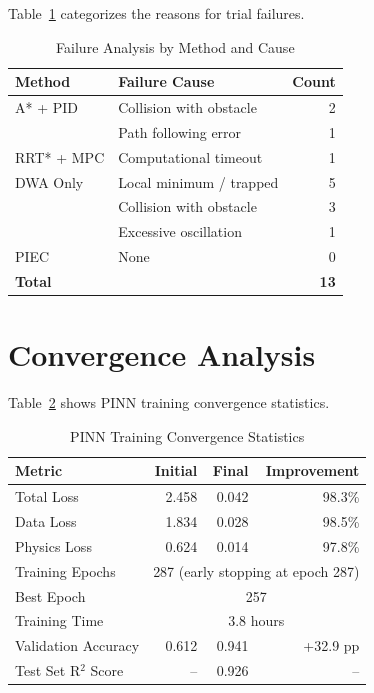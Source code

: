 Table~\ref{tab:failure_analysis} categorizes the reasons for trial failures.

\begin{table}[htbp]
\centering
\caption{Failure Analysis by Method and Cause}
\label{tab:failure_analysis}
\begin{tabular}{@{}llr@{}}
\toprule
\textbf{Method} & \textbf{Failure Cause} & \textbf{Count} \\
\midrule
A* + PID & Collision with obstacle & 2 \\
& Path following error & 1 \\
\midrule
RRT* + MPC & Computational timeout & 1 \\
\midrule
DWA Only & Local minimum / trapped & 5 \\
& Collision with obstacle & 3 \\
& Excessive oscillation & 1 \\
\midrule
PIEC & None & 0 \\
\midrule
\textbf{Total} & & \textbf{13} \\
\bottomrule
\end{tabular}
\end{table}

\clearpage

\section{Convergence Analysis}
\label{sec:convergence_analysis}

Table~\ref{tab:pinn_training} shows PINN training convergence statistics.

\begin{table}[htbp]
\centering
\caption{PINN Training Convergence Statistics}
\label{tab:pinn_training}
\begin{tabular}{@{}lrrr@{}}
\toprule
\textbf{Metric} & \textbf{Initial} & \textbf{Final} & \textbf{Improvement} \\
\midrule
Total Loss & 2.458 & 0.042 & 98.3\% \\
Data Loss & 1.834 & 0.028 & 98.5\% \\
Physics Loss & 0.624 & 0.014 & 97.8\% \\
\midrule
Training Epochs & \multicolumn{3}{c}{287 (early stopping at epoch 287)} \\
Best Epoch & \multicolumn{3}{c}{257} \\
Training Time & \multicolumn{3}{c}{3.8 hours} \\
\midrule
Validation Accuracy & 0.612 & 0.941 & +32.9 pp \\
Test Set R$^2$ Score & -- & 0.926 & -- \\
\bottomrule
\end{tabular}
\end{table}

